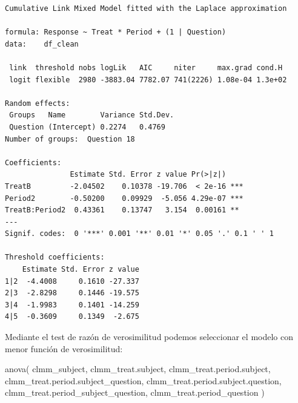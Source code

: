 \documentclass[
  12pt,
  a4paper,
  extrafontsizes,
  onecolumn,
  openright]{memoir}
\newenvironment{Shaded}{\begin{snugshade}}{\end{snugshade}}
\newcommand{\FunctionTok}[1]{\textcolor[rgb]{0.28,0.35,0.67}{#1}}
\newcommand{\NormalTok}[1]{\textcolor[rgb]{0.00,0.23,0.31}{#1}}
\begin{document}
\begin{verbatim}
Cumulative Link Mixed Model fitted with the Laplace approximation

formula: Response ~ Treat * Period + (1 | Question)
data:    df_clean

 link  threshold nobs logLik   AIC     niter     max.grad cond.H 
 logit flexible  2980 -3883.04 7782.07 741(2226) 1.08e-04 1.3e+02

Random effects:
 Groups   Name        Variance Std.Dev.
 Question (Intercept) 0.2274   0.4769  
Number of groups:  Question 18 

Coefficients:
               Estimate Std. Error z value Pr(>|z|)    
TreatB         -2.04502    0.10378 -19.706  < 2e-16 ***
Period2        -0.50200    0.09929  -5.056 4.29e-07 ***
TreatB:Period2  0.43361    0.13747   3.154  0.00161 ** 
---
Signif. codes:  0 '***' 0.001 '**' 0.01 '*' 0.05 '.' 0.1 ' ' 1

Threshold coefficients:
    Estimate Std. Error z value
1|2  -4.4008     0.1610 -27.337
2|3  -2.8298     0.1446 -19.575
3|4  -1.9983     0.1401 -14.259
4|5  -0.3609     0.1349  -2.675
\end{verbatim}

\normalsize

Mediante el test de razón de verosimilitud podemos seleccionar el modelo
con menor función de verosimilitud:

\tiny

\begin{Shaded}
\begin{Highlighting}[]
\FunctionTok{anova}\NormalTok{(}
\NormalTok{    clmm\_subject,}
\NormalTok{    clmm\_treat.subject,}
\NormalTok{    clmm\_treat.period.subject,}
\NormalTok{    clmm\_treat.period.subject\_question,}
\NormalTok{    clmm\_treat.period.subject.question,}
\NormalTok{    clmm\_treat.period\_subject\_question,}
\NormalTok{    clmm\_treat.period\_question}
\NormalTok{)}
\end{Highlighting}
\end{Shaded}
\end{document}
